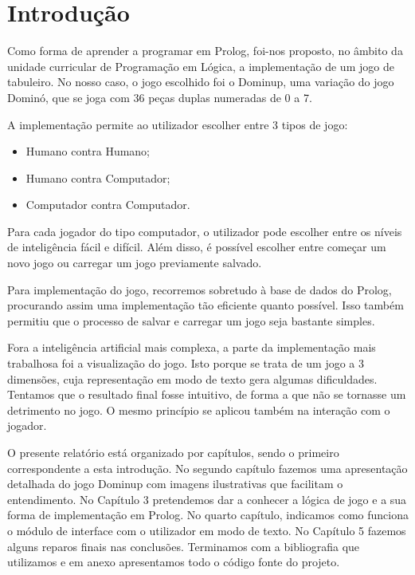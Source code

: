 \documentclass[a4paper]{article}
\begin{document}
\section{Introdução}

Como forma de aprender a programar em Prolog, foi-nos proposto, no âmbito da unidade curricular de Programação em Lógica, a implementação de um jogo de tabuleiro. No nosso caso, o jogo escolhido foi o Dominup, uma variação do jogo Dominó, que se joga com 36 peças duplas numeradas de 0 a 7.

A implementação permite ao utilizador escolher entre 3 tipos de jogo:
\begin{itemize}
	\item Humano contra Humano;
	\item Humano contra Computador;
	\item Computador contra Computador.
\end{itemize}

Para cada jogador do tipo computador, o utilizador pode escolher entre os níveis de inteligência fácil e difícil. Além disso, é possível escolher entre começar um novo jogo ou carregar um jogo previamente salvado.

Para implementação do jogo, recorremos sobretudo à base de dados do Prolog, procurando assim uma implementação tão eficiente quanto possível. Isso também permitiu que o processo de salvar e carregar um jogo seja bastante simples.

Fora a inteligência artificial mais complexa, a parte da implementação mais trabalhosa foi a visualização do jogo. Isto porque se trata de um jogo a 3 dimensões, cuja representação em modo de texto gera algumas dificuldades. Tentamos que o resultado final fosse intuitivo, de forma a que não se tornasse um detrimento no jogo. O mesmo princípio se aplicou também na interação com o jogador.

O presente relatório está organizado por capítulos, sendo o primeiro correspondente a esta introdução. No segundo capítulo fazemos uma apresentação detalhada do jogo Dominup com imagens ilustrativas que facilitam o entendimento. No Capítulo 3 pretendemos dar a conhecer a lógica de jogo e a sua forma de implementação em Prolog. No quarto capítulo, indicamos como funciona o módulo de interface com o utilizador em modo de texto. No Capítulo 5 fazemos alguns reparos finais nas conclusões. Terminamos com a bibliografia que utilizamos e em anexo apresentamos todo o código fonte do projeto.
\end{document}
